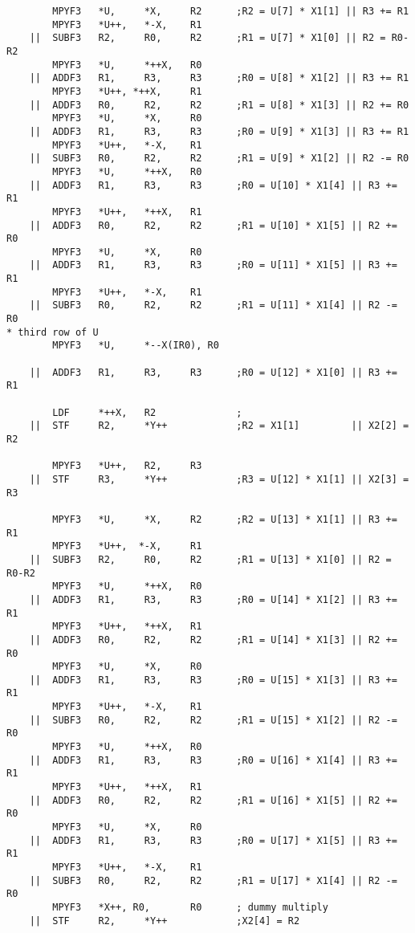 {\begin{verbatim}
        MPYF3   *U,     *X,     R2      ;R2 = U[7] * X1[1] || R3 += R1
        MPYF3   *U++,   *-X,    R1
    ||  SUBF3   R2,     R0,     R2      ;R1 = U[7] * X1[0] || R2 = R0-R2
        MPYF3   *U,     *++X,   R0
    ||  ADDF3   R1,     R3,     R3      ;R0 = U[8] * X1[2] || R3 += R1
        MPYF3   *U++, *++X,     R1
    ||  ADDF3   R0,     R2,     R2      ;R1 = U[8] * X1[3] || R2 += R0
        MPYF3   *U,     *X,     R0
    ||  ADDF3   R1,     R3,     R3      ;R0 = U[9] * X1[3] || R3 += R1
        MPYF3   *U++,   *-X,    R1
    ||  SUBF3   R0,     R2,     R2      ;R1 = U[9] * X1[2] || R2 -= R0
        MPYF3   *U,     *++X,   R0
    ||  ADDF3   R1,     R3,     R3      ;R0 = U[10] * X1[4] || R3 += R1
        MPYF3   *U++,   *++X,   R1
    ||  ADDF3   R0,     R2,     R2      ;R1 = U[10] * X1[5] || R2 += R0
        MPYF3   *U,     *X,     R0
    ||  ADDF3   R1,     R3,     R3      ;R0 = U[11] * X1[5] || R3 += R1
        MPYF3   *U++,   *-X,    R1
    ||  SUBF3   R0,     R2,     R2      ;R1 = U[11] * X1[4] || R2 -= R0
* third row of U
        MPYF3   *U,     *--X(IR0), R0

    ||  ADDF3   R1,     R3,     R3      ;R0 = U[12] * X1[0] || R3 += R1

        LDF     *++X,   R2              ;
    ||  STF     R2,     *Y++            ;R2 = X1[1]         || X2[2] = R2

        MPYF3   *U++,   R2,     R3
    ||  STF     R3,     *Y++            ;R3 = U[12] * X1[1] || X2[3] = R3

        MPYF3   *U,     *X,     R2      ;R2 = U[13] * X1[1] || R3 += R1
        MPYF3   *U++,  *-X,     R1
    ||  SUBF3   R2,     R0,     R2      ;R1 = U[13] * X1[0] || R2 = R0-R2
        MPYF3   *U,     *++X,   R0
    ||  ADDF3   R1,     R3,     R3      ;R0 = U[14] * X1[2] || R3 += R1
        MPYF3   *U++,   *++X,   R1
    ||  ADDF3   R0,     R2,     R2      ;R1 = U[14] * X1[3] || R2 += R0
        MPYF3   *U,     *X,     R0
    ||  ADDF3   R1,     R3,     R3      ;R0 = U[15] * X1[3] || R3 += R1
        MPYF3   *U++,   *-X,    R1
    ||  SUBF3   R0,     R2,     R2      ;R1 = U[15] * X1[2] || R2 -= R0
        MPYF3   *U,     *++X,   R0
    ||  ADDF3   R1,     R3,     R3      ;R0 = U[16] * X1[4] || R3 += R1
        MPYF3   *U++,   *++X,   R1
    ||  ADDF3   R0,     R2,     R2      ;R1 = U[16] * X1[5] || R2 += R0
        MPYF3   *U,     *X,     R0
    ||  ADDF3   R1,     R3,     R3      ;R0 = U[17] * X1[5] || R3 += R1
        MPYF3   *U++,   *-X,    R1
    ||  SUBF3   R0,     R2,     R2      ;R1 = U[17] * X1[4] || R2 -= R0
        MPYF3   *X++, R0,       R0      ; dummy multiply
    ||  STF     R2,     *Y++            ;X2[4] = R2


\end{verbatim}}
